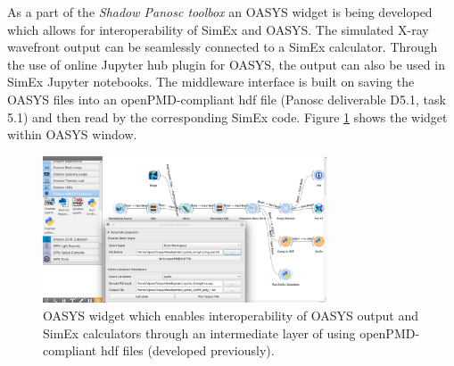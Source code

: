 \documentclass[10pt]{scrartcl}
\begin{document}
As a part of the \emph{Shadow Panosc toolbox} an OASYS widget is being developed which allows for interoperability of SimEx and OASYS. The simulated X-ray wavefront output can be seamlessly connected to a SimEx calculator. Through the use of online Jupyter hub plugin for OASYS, the output can also be used in SimEx Jupyter notebooks. The middleware interface is built on saving the OASYS files into an openPMD-compliant hdf file (Panosc deliverable D5.1, task 5.1) and then read by the corresponding SimEx code. Figure \ref{fig:simex_oasys_widget} shows the widget within OASYS window.

\begin{figure}[htb]
    \centering
    \includegraphics[width=0.75\textwidth]{figures/simexOasysWidget.png}
    \caption{OASYS widget which enables interoperability of OASYS output and SimEx calculators through an intermediate layer of using openPMD-compliant hdf files (developed previously).}
    \label{fig:simex_oasys_widget}
\end{figure}
\end{document}
